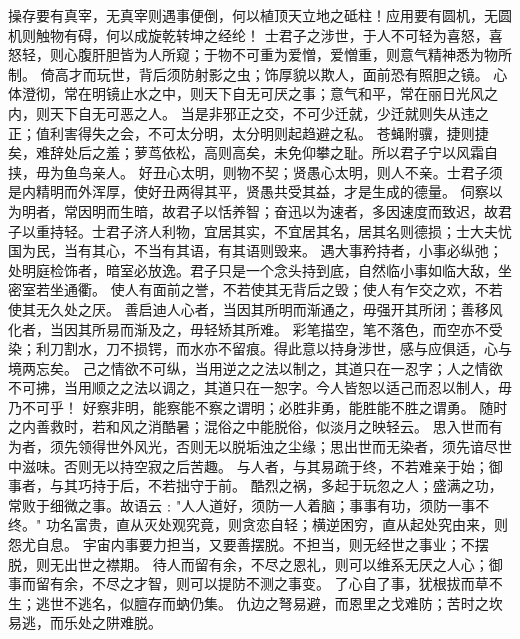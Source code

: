 \documentclass[12pt,UTF8]{ctexbook}
\begin{document}
操存要有真宰，无真宰则遇事便倒，何以植顶天立地之砥柱！应用要有圆机，无圆机则触物有碍，何以成旋乾转坤之经纶！
士君子之涉世，于人不可轻为喜怒，喜怒轻，则心腹肝胆皆为人所窥；于物不可重为爱憎，爱憎重，则意气精神悉为物所制。
倚高才而玩世，背后须防射影之虫；饰厚貌以欺人，面前恐有照胆之镜。
心体澄彻，常在明镜止水之中，则天下自无可厌之事；意气和平，常在丽日光风之内，则天下自无可恶之人。
当是非邪正之交，不可少迁就，少迁就则失从违之正；值利害得失之会，不可太分明，太分明则起趋避之私。
苍蝇附骥，捷则捷矣，难辞处后之羞；萝茑依松，高则高矣，未免仰攀之耻。所以君子宁以风霜自挟，毋为鱼鸟亲人。
好丑心太明，则物不契；贤愚心太明，则人不亲。士君子须是内精明而外浑厚，使好丑两得其平，贤愚共受其益，才是生成的德量。
伺察以为明者，常因明而生暗，故君子以恬养智；奋迅以为速者，多因速度而致迟，故君子以重持轻。士君子济人利物，宜居其实，不宜居其名，居其名则德损；士大夫忧国为民，当有其心，不当有其语，有其语则毁来。
遇大事矜持者，小事必纵弛；处明庭检饰者，暗室必放逸。君子只是一个念头持到底，自然临小事如临大敌，坐密室若坐通衢。
使人有面前之誉，不若使其无背后之毁；使人有乍交之欢，不若使其无久处之厌。
善启迪人心者，当因其所明而渐通之，毋强开其所闭；善移风化者，当因其所易而渐及之，毋轻矫其所难。
彩笔描空，笔不落色，而空亦不受染；利刀割水，刀不损锷，而水亦不留痕。得此意以持身涉世，感与应俱适，心与境两忘矣。
己之情欲不可纵，当用逆之之法以制之，其道只在一忍字；人之情欲不可拂，当用顺之之法以调之，其道只在一恕字。今人皆恕以适己而忍以制人，毋乃不可乎！
好察非明，能察能不察之谓明；必胜非勇，能胜能不胜之谓勇。
随时之内善救时，若和风之消酷暑；混俗之中能脱俗，似淡月之映轻云。
思入世而有为者，须先领得世外风光，否则无以脱垢浊之尘缘；思出世而无染者，须先谙尽世中滋味。否则无以持空寂之后苦趣。
与人者，与其易疏于终，不若难亲于始；御事者，与其巧持于后，不若拙守于前。
酷烈之祸，多起于玩忽之人；盛满之功，常败于细微之事。故语云﹕"人人道好，须防一人着脑；事事有功，须防一事不终。"
功名富贵，直从灭处观究竟，则贪恋自轻；横逆困穷，直从起处究由来，则怨尤自息。
宇宙内事要力担当，又要善摆脱。不担当，则无经世之事业；不摆脱，则无出世之襟期。
待人而留有余，不尽之恩礼，则可以维系无厌之人心；御事而留有余，不尽之才智，则可以提防不测之事变。
了心自了事，犹根拔而草不生；逃世不逃名，似膻存而蚋仍集。
仇边之弩易避，而恩里之戈难防；苦时之坎易逃，而乐处之阱难脱。
\end{document}
